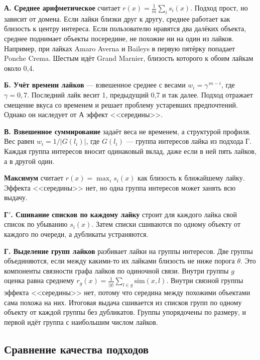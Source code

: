 \textbf{А. Среднее арифметическое} считает $r(x) = \frac1m\sum_i s_i(x)$. Подход прост, но зависит от домена. Если лайки близки друг к другу, среднее работает как близость к центру интереса. Если пользователю нравятся два далёких объекта, среднее поднимает объекты посередине, не похожие ни на один из лайков. Например, при лайках Amaro Averna и Baileys в первую пятёрку попадает Ponche Crema. Шестым идёт Grand Marnier, близость которого к обоим лайкам около 0,4.

\textbf{Б. Учёт времени лайков} --- взвешенное среднее с весами $w_i = \gamma^{\,m-i}$, где $\gamma = 0{,}7$. Последний лайк весит 1, предыдущий 0,7 и так далее. Подход отражает смещение вкуса со временем и решает проблему устаревших предпочтений. Однако он наследует от А эффект <<середины>>.

\textbf{В. Взвешенное суммирование} задаёт веса не временем, а структурой профиля. Вес равен $w_i = 1/|G(l_i)|$, где $G(l_i)$ --- группа интересов лайка из подхода Г. Каждая группа интересов вносит одинаковый вклад, даже если в ней пять лайков, а в другой один.

\textbf{Максимум} считает $r(x) = \max_i s_i(x)$ как близость к ближайшему лайку. Эффекта <<середины>> нет, но одна группа интересов может занять всю выдачу.

\textbf{Г$'$. Сшивание списков по каждому лайку} строит для каждого лайка свой список по убыванию $s_i(x)$. Затем списки сшиваются по одному объекту от каждого по очереди, а дубликаты устраняются.

\textbf{Г. Выделение групп лайков} разбивает лайки на группы интересов. Две группы объединяются, если между какими-то их лайками близость не ниже порога $\theta$. Это компоненты связности графа лайков по одиночной связи. Внутри группы $g$ оценка равна среднему $r_g(x) = \frac1{|g|}\sum_{l\in g}\mathrm{sim}(x,l)$. Внутри связной группы эффекта <<середины>> нет, потому что середина между похожими объектами сама похожа на них. Итоговая выдача сшивается из списков групп по одному объекту от каждой группы без дубликатов. Группы упорядочены по размеру, и первой идёт группа с наибольшим числом лайков.

\subsection{Сравнение качества подходов}


